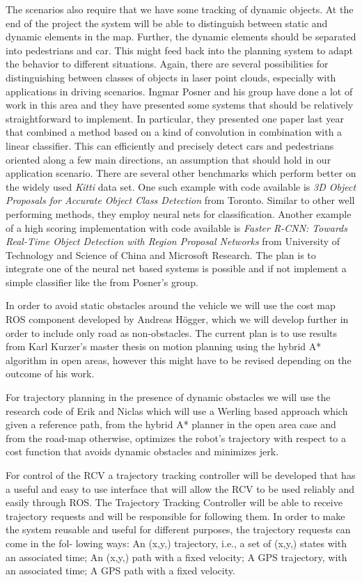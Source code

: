 \documentclass[11pt,a4paper]{article}
\begin{document}
The scenarios also require that we have some tracking of dynamic objects.
At the end of the project the system will be able to distinguish between
static and dynamic elements in the map. Further, the dynamic elements should
be separated into pedestrians and car. This might feed back into the planning
system to adapt the behavior to different situations. Again, there are
several possibilities for distinguishing between classes of objects in
laser point clouds, especially with applications in driving scenarios.
Ingmar Posner and his group have done a lot of work in this area and they
have presented some systems that should be relatively straightforward to
implement. In particular, they presented one paper last year that combined
a method based on a kind of convolution in combination with a linear
classifier. This can efficiently and precisely detect cars and
pedestrians oriented along a few main directions, an assumption that should
hold in our application scenario.
There are several other benchmarks which perform better on the widely used
\textit{Kitti} data set. One such example with code available is
\textit{3D Object Proposals for Accurate Object Class Detection} from Toronto.
Similar to other well performing methods, they employ neural nets for
classification. Another example of a high scoring implementation with
code available is \textit{Faster R-CNN: Towards Real-Time Object
Detection with Region Proposal Networks} from University of Technology
and Science of China and Microsoft Research.
The plan is to integrate one of the neural net based systems is possible
and if not implement a simple classifier like the from Posner's group.

In order to avoid static obstacles around the vehicle we will use the
cost map ROS component developed by Andreas Högger, which we will
develop further in order to include only road as non-obstacles. The
current plan is to use results from Karl Kurzer's master thesis on
motion planning using the hybrid A* algorithm in open areas, however
this might have to be revised depending on the outcome of his work.

For trajectory planning in the presence of dynamic obstacles we will
use the research code of Erik and Niclas which will use a Werling
based approach which given a reference path, from the hybrid A* planner
in the open area case and from the road-map otherwise, optimizes the
robot's trajectory with respect to a cost function that avoids dynamic
obstacles and minimizes jerk.

For control of the RCV a trajectory tracking controller will be
developed that has a useful and easy to use interface that will allow
the RCV to be used reliably and easily through ROS. The Trajectory
Tracking Controller will be able to receive trajectory requests and
will be responsible for following them. In order to make the system
reusable and useful for different purposes, the trajectory requests
can come in the fol- lowing ways: An (x,y,) trajectory, i.e., a set of
(x,y,) states with an associated time; An (x,y,) path with a fixed
velocity; A GPS trajectory, with an associated time; A GPS path with a
fixed velocity.
\end{document}
